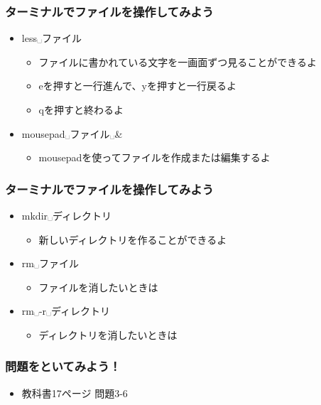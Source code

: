\begin{frame}
    \frametitle{ターミナルでファイルを操作してみよう}
    \begin{itemize}
        \item less␣ファイル
        \begin{itemize}
            \item ファイルに書かれている文字を一画面ずつ見ることができるよ
            \item eを押すと一行進んで、yを押すと一行戻るよ
            \item qを押すと終わるよ
        \end{itemize}
        \item mousepad␣ファイル␣\&
        \begin{itemize}
            \item mousepadを使ってファイルを作成または編集するよ
        \end{itemize}
    \end{itemize}
\end{frame}

\begin{frame}
    \frametitle{ターミナルでファイルを操作してみよう}
    \begin{itemize}
        \item mkdir␣ディレクトリ
        \begin{itemize}
            \item 新しいディレクトリを作ることができるよ
        \end{itemize}
        \item rm␣ファイル
        \begin{itemize}
            \item ファイルを消したいときは
        \end{itemize}
        \item rm␣-r␣ディレクトリ
        \begin{itemize}
            \item ディレクトリを消したいときは
        \end{itemize}
    \end{itemize}
    \begin{figure}[h]
        \centering
        
    \end{figure}
\end{frame}

\begin{frame}
    \frametitle{問題をといてみよう！}
    \begin{itemize}
        \item 教科書17ページ 問題3-6
    \end{itemize}
\end{frame}

